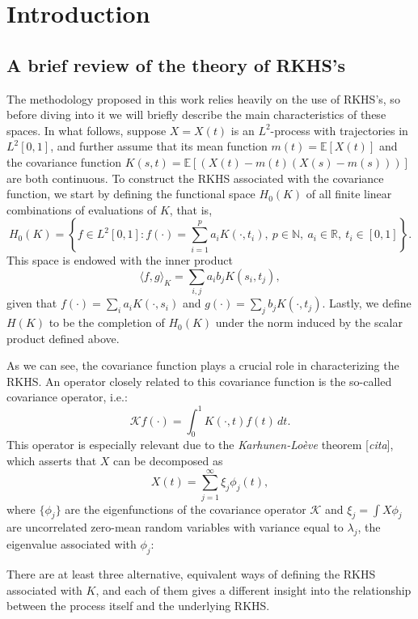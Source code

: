 \documentclass[ba]{imsart}
\numberwithin{equation}{section}
\theoremstyle{plain}
\newcommand{\N}{\mathbb{N}}
\newcommand{\R}{\mathbb{R}}
\newcommand\incomment[1]{\color{red}[\textit{#1}]\color{black}}
\begin{document}
\section{Introduction}

\subsection{A brief review of the theory of RKHS's}

The methodology proposed in this work relies heavily on the use of RKHS's, so before diving into it we will briefly describe the main characteristics of these spaces. In what follows, suppose \(X=X(t)\) is an \(L^2\)-process with trajectories in \(L^2[0,1]\), and further assume that its mean function \(m(t)=\mathbb E[X(t)]\) and the covariance function \(K(s, t)= \mathbb E[(X(t) - m(t)(X(s) - m(s)))]\) are both continuous. To construct the RKHS associated with the covariance function, we start by defining the functional space \(H_0(K)\) of all finite linear combinations of evaluations of \(K\), that is,
\[
H_0(K) = \left\{ f \in L^2[0,1]: f(\cdot) = \sum_{i=1}^p a_i K(\cdot, t_i), \ p \in \N, \ a_i \in \R, \ t_i \in [0, 1] \right\}.
\]
This space is endowed with the inner product
\[
\langle f, g\rangle_K = \sum_{i, j} a_i b_j K(s_i, t_j),
\]
given that \(f(\cdot)=\sum_i a_i K(\cdot, s_i) \) and \(g(\cdot)=\sum_j b_j K(\cdot, t_j)\). Lastly, we define \(H(K)\) to be the completion of \(H_0(K)\) under the norm induced by the scalar product defined above.

As we can see, the covariance function plays a crucial role in characterizing the RKHS. An operator closely related to this covariance function is the so-called covariance operator, i.e.:
\[
\mathcal Kf(\cdot) = \int_0^1 K(\cdot, t)f(t)\, dt.
\]
This operator is especially relevant due to the \textit{Karhunen-Loève} theorem \incomment{cita}, which asserts that \(X\) can be decomposed as
\[
X(t) = \sum_{j=1}^\infty \xi_j \phi_j(t),
\]
where \(\{\phi_j\}\) are the eigenfunctions of the covariance operator \(\mathcal K\) and \(\xi_j = \int X\phi_j\) are uncorrelated zero-mean random variables with variance equal to \(\lambda_j\), the eigenvalue associated with \(\phi_j\):



There are at least three alternative, equivalent ways of defining the RKHS associated with \(K\), and each of them gives a different insight into the relationship between the process itself and the underlying RKHS.
\end{document}
